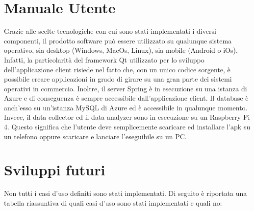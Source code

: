 \section{Manuale Utente}
Grazie alle scelte tecnologiche con cui sono stati implementati i diversi componenti, il prodotto software può essere utilizzato su qualunque sistema operativo, sia desktop (Windows, MacOs, Linux), sia mobile (Android o iOs).
Infatti, la particolarità del framework Qt utilizzato per lo sviluppo dell'applicazione client risiede nel fatto che, con un unico codice sorgente, è possibile creare applicazioni in grado di girare su una gran parte dei sistemi operativi in commercio. 
Inoltre, il server Spring è in esecuzione su una istanza di Azure e di conseguenza è sempre accessibile dall'applicazione client.
Il database è anch'esso su un'istanza MySQL di Azure ed è accessibile in qualunque momento.
Invece, il data collector ed il data analyzer sono in esecuzione su un Raspberry Pi 4.
Questo significa che l'utente deve semplicemente scaricare ed installare l'apk su un telefono oppure scaricare e lanciare l'eseguibile su un PC.

\section{Sviluppi futuri}
Non tutti i casi d'uso definiti sono stati implementati. Di seguito è riportata una tabella riassuntiva di quali casi d'uso sono stati implementati e quali no:

